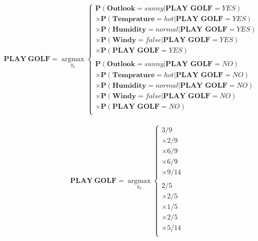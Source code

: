 \documentclass[11pt, a4paper]{article}
\begin{document}
\begin{align*}
	\mathbf{PLAY\ GOLF} = \operatorname*{argmax}_{y_k}\left\{          
	\begin{array}{ll}                                                  
	\mathbf{P}(\textbf{Outlook}=sunny|\textbf{PLAY\ GOLF}=YES)         \\
	\times\mathbf{P}(\textbf{Temprature}=hot|\textbf{PLAY\ GOLF}=YES)  \\
	\times\mathbf{P}(\textbf{Humidity}=normal|\textbf{PLAY\ GOLF}=YES) \\
	\times\mathbf{P}(\textbf{Windy}=false|\textbf{PLAY\ GOLF}=YES)     \\
	\times\mathbf{P}(\textbf{PLAY\ GOLF}=YES)                          \\
	                                                                   \\
	\mathbf{P}(\textbf{Outlook}=sunny|\textbf{PLAY\ GOLF}=NO)          \\
	\times\mathbf{P}(\textbf{Temprature}=hot|\textbf{PLAY\ GOLF}=NO)   \\
	\times\mathbf{P}(\textbf{Humidity}=normal|\textbf{PLAY\ GOLF}=NO)  \\
	\times\mathbf{P}(\textbf{Windy}=false|\textbf{PLAY\ GOLF}=NO)      \\
	\times\mathbf{P}(\textbf{PLAY\ GOLF}=NO)                           \\
	\end{array}                                                        
	\right.                                                            
\end{align*}

\begin{align*}
	\mathbf{PLAY\ GOLF} = \operatorname*{argmax}_{y_k}\left\{ 
	\begin{array}{ll}                                         
	3/9                                                       \\
	\times2/9                                                 \\
	\times6/9                                                 \\
	\times6/9                                                 \\
	\times9/14                                                \\
	                                                          \\
	2/5                                                       \\
	\times2/5                                                 \\
	\times1/5                                                 \\
	\times2/5                                                 \\
	\times5/14                                                \\
	\end{array}                                               
	\right.                                                   
\end{align*}
\end{document}
